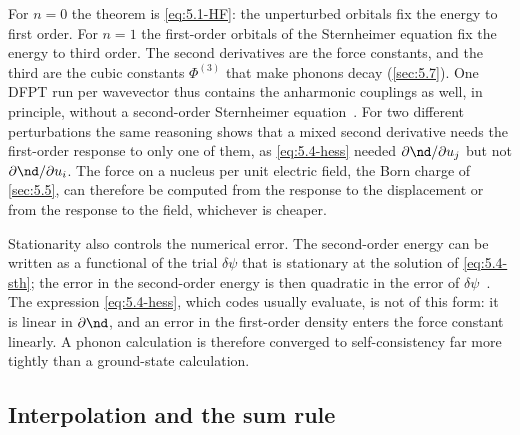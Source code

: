 For $n = 0$ the theorem is \cref{eq:5.1-HF}: the unperturbed orbitals fix the energy to first order. For $n = 1$ the first-order orbitals of the Sternheimer equation fix the energy to third order. The second derivatives are the force constants, and the third are the cubic constants $\Phi^{(3)}$ that make phonons decay (\cref{sec:5.7}). One DFPT run per wavevector thus contains the anharmonic couplings as well, in principle, without a second-order Sternheimer equation~\cite[Eq.~(123)]{baroni2001phonons}. For two different perturbations the same reasoning shows that a mixed second derivative needs the first-order response to only one of them, as \cref{eq:5.4-hess} needed $\partial\nd/\partial u_j$ but not $\partial\nd/\partial u_i$. The force on a nucleus per unit electric field, the Born charge of \cref{sec:5.5}, can therefore be computed from the response to the displacement or from the response to the field, whichever is cheaper.

Stationarity also controls the numerical error. The second-order energy can be written as a functional of the trial $\delta\psi$ that is stationary at the solution of \cref{eq:5.4-sth}; the error in the second-order energy is then quadratic in the error of $\delta\psi$~\cite[Sect.~II.C.3]{baroni2001phonons}. The expression \cref{eq:5.4-hess}, which codes usually evaluate, is not of this form: it is linear in $\partial\nd$, and an error in the first-order density enters the force constant linearly. A phonon calculation is therefore converged to self-consistency far more tightly than a ground-state calculation.

\subsection{Interpolation and the sum rule}

